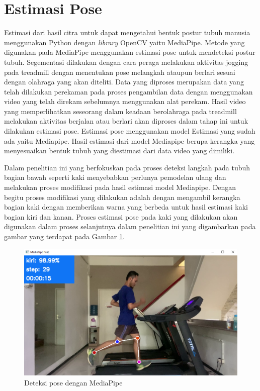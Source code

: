 \section{Estimasi Pose}
\label{sec:EstimasiPose}

Estimasi dari hasil citra untuk dapat mengetahui bentuk postur tubuh manusia menggunakan Python dengan \emph{library} OpenCV yaitu MediaPipe. Metode yang digunakan pada MediaPipe menggunakan estimasi pose untuk mendeteksi postur tubuh. Segementasi dilakukan dengan cara peraga melakukan aktivitas jogging pada treadmill dengan menentukan pose melangkah ataupun berlari sesuai dengan olahraga yang akan diteliti. Data yang diproses merupakan data yang telah dilakukan perekaman pada proses pengambilan data dengan menggunakan video yang telah direkam sebelumnya menggunakan alat perekam. Hasil video yang memperlihatkan seseorang dalam keadaan berolahraga pada treadmill melakukan aktivitas berjalan atau berlari akan diproses dalam tahap ini untuk dilakukan estimasi pose. Estimasi pose menggunakan model Estimasi yang sudah ada yaitu Mediapipe. Hasil estimasi dari model Mediapipe berupa kerangka yang menyesuaikan bentuk tubuh yang diestimasi dari data video yang dimiliki.

Dalam penelitian ini yang berfokuskan pada proses deteksi langkah pada tubuh bagian bawah seperti kaki menyebabkan perlunya pemodelan ulang dan melakukan proses modifikasi pada hasil estimasi model Mediapipe. Dengan begitu proses modifikasi yang dilakukan adalah dengan mengambil kerangka bagian kaki dengan memberikan warna yang berbeda untuk hasil estimasi kaki bagian kiri dan kanan. Proses estimasi pose pada kaki yang dilakukan akan digunakan dalam proses selanjutnya dalam penelitian ini yang digambarkan pada gambar yang terdapat pada Gambar \ref{fig:DeteksiEstimasi}.

\begin{figure}[H]
  \centering
  \includegraphics[scale=0.45]{gambar/deteksi pose.png}
  \caption{Deteksi pose dengan MediaPipe}
  \label{fig:DeteksiEstimasi}
\end{figure}

